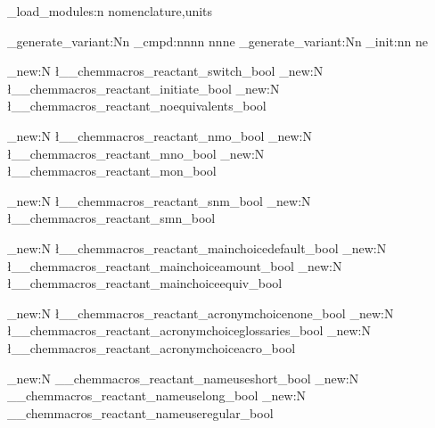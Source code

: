 
\chemmacros_load_modules:n {nomenclature,units}
\RequirePackage {chemnum}

\cs_generate_variant:Nn \chemnum_cmpd:nnnn {nnne}
\cs_generate_variant:Nn \chemnum_init:nn {ne}

\bool_new:N \l__chemmacros_reactant_switch_bool
\bool_new:N \l__chemmacros_reactant_initiate_bool
\bool_new:N \l__chemmacros_reactant_noequivalents_bool

\bool_new:N \l__chemmacros_reactant_nmo_bool
\bool_new:N \l__chemmacros_reactant_mno_bool
\bool_new:N \l__chemmacros_reactant_mon_bool

\bool_new:N \l__chemmacros_reactant_snm_bool
\bool_new:N \l__chemmacros_reactant_smn_bool

\bool_new:N \l__chemmacros_reactant_mainchoicedefault_bool
\bool_new:N \l__chemmacros_reactant_mainchoiceamount_bool
\bool_new:N \l__chemmacros_reactant_mainchoiceequiv_bool

\bool_new:N \l__chemmacros_reactant_acronymchoicenone_bool
\bool_new:N \l__chemmacros_reactant_acronymchoiceglossaries_bool
\bool_new:N \l__chemmacros_reactant_acronymchoiceacro_bool

\bool_new:N \__chemmacros_reactant_nameuseshort_bool
\bool_new:N \__chemmacros_reactant_nameuselong_bool
\bool_new:N \__chemmacros_reactant_nameuseregular_bool


